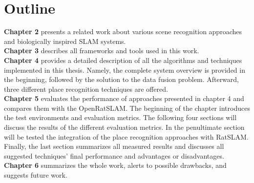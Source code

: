 \section{Outline}\label{section:outline}

\textbf{Chapter 2} presents a related work about various scene recognition approaches and biologically inspired SLAM systems.\\
\textbf{Chapter 3} describes all frameworks and tools used in this work.\\
\textbf{Chapter 4} provides a detailed description of all the algorithms and techniques implemented in this thesis. Namely, the complete system overview is provided in the beginning, followed by the solution to the data fusion problem. Afterward, three different place recognition techniques are offered.\\
\textbf{Chapter 5} evaluates the performance of approaches presented in chapter 4 and compares them with the OpenRatSLAM. The beginning of the chapter introduces the test environments and evaluation metrics. The following four sections will discuss the results of the different evaluation metrics. In the penultimate section will be tested the integration of the place recognition approaches with RatSLAM. Finally, the last section summarizes all measured results and discusses all suggested techniques' final performance and advantages or disadvantages.\\
\textbf{Chapter 6} summarizes the whole work, alerts to possible drawbacks, and suggests future work.\\
